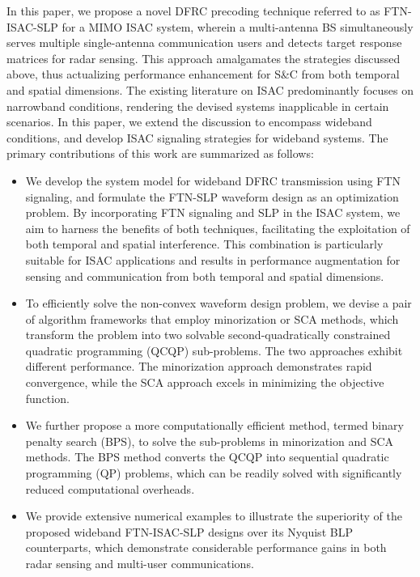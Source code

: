 \documentclass[lettersize,journal]{IEEEtran}
\newcommand{\nocolor}[1]{{\color{black}#1}}
\begin{document}
In this paper, we propose a novel DFRC precoding technique referred to as FTN-ISAC-SLP for a MIMO ISAC system, wherein a multi-antenna BS simultaneously serves multiple single-antenna communication users and detects target response matrices for radar sensing. This approach amalgamates the strategies discussed above, thus actualizing performance enhancement for S\&C from both temporal and spatial dimensions. The existing literature on ISAC predominantly focuses on narrowband conditions, rendering the devised systems inapplicable in certain scenarios. In this paper, we extend the discussion to encompass wideband conditions, {\nocolor{and develop ISAC signaling strategies for wideband systems.}} The primary contributions of this work are summarized as follows:
\begin{itemize}
\item \nocolor{We develop the system model for wideband DFRC transmission using FTN signaling, and formulate the FTN-SLP waveform design \nocolor{as} an optimization problem}. By incorporating FTN signaling and SLP in the ISAC system, we aim to harness the benefits of both techniques, facilitating the exploitation of both temporal and spatial interference.
This combination is particularly suitable for ISAC applications and results in performance augmentation for sensing and communication from both temporal and spatial dimensions.
\item To efficiently solve the non-convex waveform design problem, we devise a pair of algorithm frameworks that employ minorization or SCA methods, which transform the problem into two solvable second-quadratically constrained quadratic programming (QCQP) sub-problems. The two approaches exhibit different performance. The minorization approach demonstrates rapid convergence, while the SCA approach excels in minimizing the objective function.
\item We further propose a more computationally efficient method, termed binary penalty search (BPS), to solve the sub-problems in minorization and SCA methods. The BPS method converts the QCQP into sequential quadratic programming (QP) problems, which can be readily solved with significantly reduced computational overheads.
\item \nocolor{We provide extensive numerical examples to illustrate the superiority of the proposed wideband FTN-ISAC-SLP designs over its Nyquist BLP counterparts, which demonstrate considerable performance gains in both radar sensing and multi-user communications.}
\end{itemize}
\end{document}
